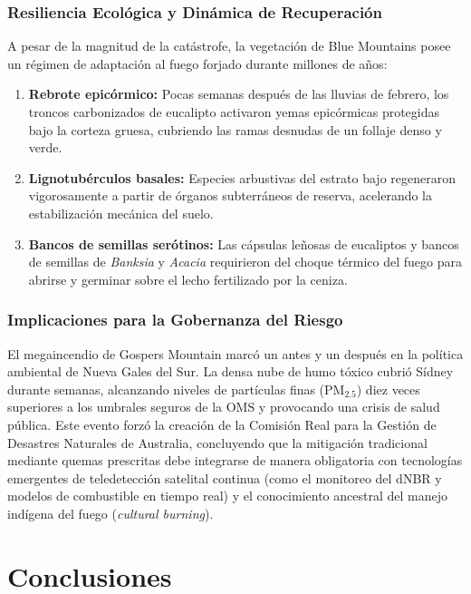 \documentclass[12pt]{article}
\begin{document}
\subsubsection{Resiliencia Ecológica y Dinámica de Recuperación}
A pesar de la magnitud de la catástrofe, la vegetación de Blue Mountains posee un régimen de adaptación al fuego forjado durante millones de años:
\begin{enumerate}
    \item \textbf{Rebrote epicórmico:} Pocas semanas después de las lluvias de febrero, los troncos carbonizados de eucalipto activaron yemas epicórmicas protegidas bajo la corteza gruesa, cubriendo las ramas desnudas de un follaje denso y verde.
    \item \textbf{Lignotubérculos basales:} Especies arbustivas del estrato bajo regeneraron vigorosamente a partir de órganos subterráneos de reserva, acelerando la estabilización mecánica del suelo.
    \item \textbf{Bancos de semillas serótinos:} Las cápsulas leñosas de eucaliptos y bancos de semillas de \textit{Banksia} y \textit{Acacia} requirieron del choque térmico del fuego para abrirse y germinar sobre el lecho fertilizado por la ceniza.
\end{enumerate}

\subsubsection{Implicaciones para la Gobernanza del Riesgo}
El megaincendio de Gospers Mountain marcó un antes y un después en la política ambiental de Nueva Gales del Sur. La densa nube de humo tóxico cubrió Sídney durante semanas, alcanzando niveles de partículas finas ($\text{PM}_{2.5}$) diez veces superiores a los umbrales seguros de la OMS y provocando una crisis de salud pública. Este evento forzó la creación de la Comisión Real para la Gestión de Desastres Naturales de Australia, concluyendo que la mitigación tradicional mediante quemas prescritas debe integrarse de manera obligatoria con tecnologías emergentes de teledetección satelital continua (como el monitoreo del dNBR y modelos de combustible en tiempo real) y el conocimiento ancestral del manejo indígena del fuego (\textit{cultural burning}).

\section{Conclusiones}
\end{document}
